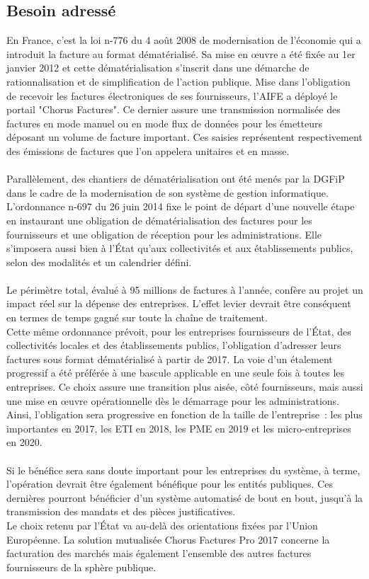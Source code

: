 \documentclass[12pt,a4paper]{article}
\begin{document}
\subsection{Besoin adressé}
En France, c'est la loi n-776 du 4 août 2008 de modernisation de l'économie qui a introduit la facture au format dématérialisé. Sa mise en œuvre a été fixée au 1er janvier 2012 et cette dématérialisation s’inscrit dans une démarche de rationnalisation et de simplification de l’action publique. Mise dans l'obligation de recevoir les factures électroniques de ses fournisseurs, l'AIFE a déployé le portail "Chorus Factures". Ce dernier assure une transmission normalisée des factures en mode manuel ou en mode flux de données pour les émetteurs déposant un volume de facture important. Ces saisies représentent respectivement des émissions de factures que l'on appelera unitaires et en masse.\\\\
Parallèlement, des chantiers de dématérialisation ont été menés par la \gls{DGFiP} dans le cadre de la modernisation de son système de gestion informatique.
L’ordonnance n-697 du 26 juin 2014 fixe le point de départ d’une nouvelle étape en instaurant une obligation de dématérialisation des factures pour les fournisseurs et une obligation de réception pour les administrations. Elle s'imposera aussi bien à l'État qu'aux collectivités et aux établissements publics, selon des modalités et un calendrier défini.\\\\
Le périmètre total, évalué à 95 millions de factures à l'année, confère au projet un impact réel sur la dépense des entreprises. L'effet levier devrait être conséquent en termes de temps gagné sur toute la chaîne de traitement.\\
Cette même ordonnance prévoit, pour les entreprises fournisseurs de l'État, des collectivités locales et des établissements publics, l'obligation d'adresser leurs factures sous format dématérialisé à partir de 2017. La voie d'un étalement progressif a été préférée à une bascule applicable en une seule fois à toutes les entreprises. Ce choix assure une transition plus aisée, côté fournisseurs, mais aussi une mise en œuvre opérationnelle dès le démarrage pour les administrations. Ainsi, l’obligation sera progressive en fonction de la taille de l'entreprise~: les plus importantes en 2017, les \gls{ETI} en 2018, les \gls{PME} en 2019 et les micro-entreprises en 2020.\\\\
Si le bénéfice sera sans doute important pour les entreprises du système, à terme, l'opération devrait être également bénéfique pour les entités publiques. Ces dernières pourront bénéficier d'un système automatisé de bout en bout, jusqu'à la transmission des mandats et des pièces justificatives.\\
Le choix retenu par l'État va au-delà des orientations fixées par l’Union Européenne. La solution mutualisée Chorus Factures Pro 2017 concerne la facturation des marchés mais également l'ensemble des autres factures fournisseurs de la sphère publique.
\newpage
\end{document}
